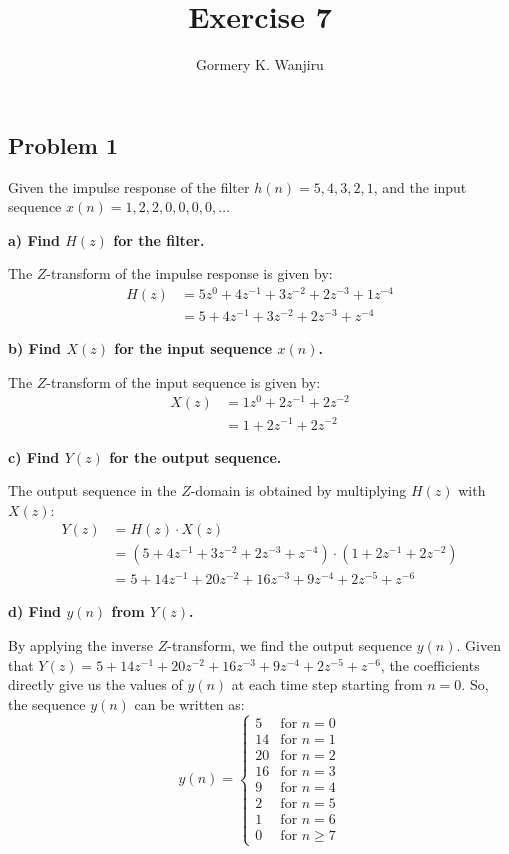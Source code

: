 \documentclass{article}
\begin{document}
\title{Exercise 7}
\author{Gormery K. Wanjiru}
\date{}
\maketitle
\subsection*{Problem 1}

Given the impulse response of the filter $h(n) = 5, 4, 3, 2, 1$, and the input sequence $x(n) = 1, 2, 2, 0, 0, 0, 0, \dots$

\textbf{a) Find $H(z)$ for the filter.}

The $Z$-transform of the impulse response is given by:
\begin{align*}
H(z) &= 5z^0 + 4z^{-1} + 3z^{-2} + 2z^{-3} + 1z^{-4} \\
&= 5 + 4z^{-1} + 3z^{-2} + 2z^{-3} + z^{-4}
\end{align*}

\textbf{b) Find $X(z)$ for the input sequence $x(n)$.}

The $Z$-transform of the input sequence is given by:
\begin{align*}
X(z) &= 1z^0 + 2z^{-1} + 2z^{-2} \\
&= 1 + 2z^{-1} + 2z^{-2}
\end{align*}

\textbf{c) Find $Y(z)$ for the output sequence.}

The output sequence in the $Z$-domain is obtained by multiplying $H(z)$ with $X(z)$:
\begin{align*}
Y(z) &= H(z) \cdot X(z) \\
&= (5 + 4z^{-1} + 3z^{-2} + 2z^{-3} + z^{-4}) \cdot (1 + 2z^{-1} + 2z^{-2}) \\
&= 5 + 14z^{-1} + 20z^{-2} + 16z^{-3} + 9z^{-4} + 2z^{-5} + z^{-6}
\end{align*}

\textbf{d) Find $y(n)$ from $Y(z)$.}

By applying the inverse $Z$-transform, we find the output sequence $y(n)$.
Given that $Y(z) = 5 + 14z^{-1} + 20z^{-2} + 16z^{-3} + 9z^{-4} + 2z^{-5} + z^{-6}$, the coefficients directly give us the values of $y(n)$ at each time step starting from $n=0$. So, the sequence $y(n)$ can be written as:
\[
y(n) = \begin{cases} 
5 & \text{for } n = 0 \\
14 & \text{for } n = 1 \\
20 & \text{for } n = 2 \\
16 & \text{for } n = 3 \\
9 & \text{for } n = 4 \\
2 & \text{for } n = 5 \\
1 & \text{for } n = 6 \\
0 & \text{for } n \geq 7
\end{cases}
\]
\end{document}
